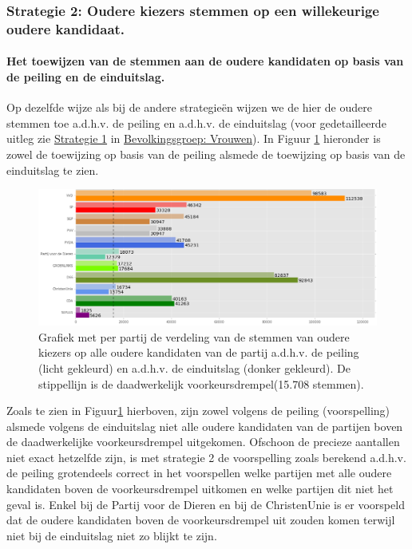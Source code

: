\subsubsection{Strategie 2: Oudere kiezers stemmen op een willekeurige oudere kandidaat.}




\paragraph{Het toewijzen van de stemmen aan de oudere kandidaten op basis van de peiling en de einduitslag.}
Op dezelfde wijze als bij de andere strategie\"{e}n wijzen we de hier de oudere stemmen toe a.d.h.v. de peiling en a.d.h.v. de einduitslag (voor gedetailleerde uitleg zie \hyperref[S1V]{Strategie 1} in \hyperref[vrouwen]{Bevolkingsgroep: Vrouwen}). In Figuur \ref{fig:stemmenS2O} hieronder is zowel de toewijzing op basis van de peiling alsmede de toewijzing op basis van de einduitslag te zien.


\begin{figure}[H]

	\includegraphics[width=\linewidth]	{stemmen_op_ouderen_willekeurig_samen.png}

			\caption{Grafiek met per partij de verdeling van de stemmen van oudere kiezers op alle oudere kandidaten van de partij a.d.h.v. de peiling (licht gekleurd) en a.d.h.v. de einduitslag (donker gekleurd). De stippellijn is de daadwerkelijk voorkeursdrempel(15.708 stemmen).}

\label{fig:stemmenS2O}
\end{figure}

Zoals te zien in Figuur\ref{fig:stemmenS2O} hierboven, zijn zowel volgens de peiling (voorspelling) alsmede volgens de einduitslag niet alle oudere kandidaten van de partijen boven de daadwerkelijke voorkeursdrempel uitgekomen. Ofschoon de precieze aantallen niet exact hetzelfde zijn, is met strategie 2 de voorspelling zoals berekend a.d.h.v. de peiling grotendeels correct in het voorspellen welke partijen met alle oudere kandidaten boven de voorkeursdrempel uitkomen en welke partijen dit niet het geval is. Enkel bij de Partij voor de Dieren en bij de ChristenUnie is er voorspeld dat de oudere kandidaten boven de voorkeursdrempel uit zouden komen terwijl niet bij de einduitslag niet zo blijkt te zijn.

